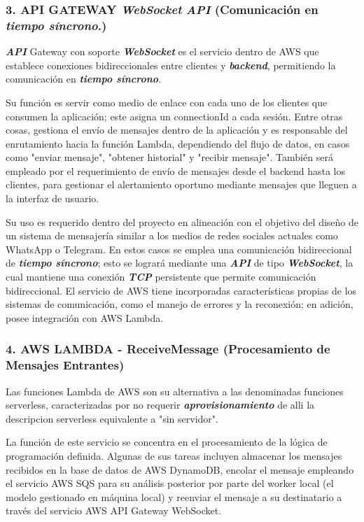 \subsubsection{3. API GATEWAY \textbf{\textit{WebSocket}} \textbf{\textit{API}} (Comunicación en \textbf{\textit{tiempo síncrono}}.)}

\textbf{\textit{API}} Gateway con soporte \textbf{\textit{WebSocket}} es el servicio dentro de AWS que establece conexiones bidireccionales entre clientes y \textbf{\textit{backend}}, permitiendo la comunicación en \textbf{\textit{tiempo síncrono}}.

Su función es servir como medio de enlace con cada uno de los clientes que consumen la aplicación; este asigna un connectionId a cada sesión. Entre otras cosas, gestiona el envío de mensajes dentro de la aplicación y es responsable del enrutamiento hacia la función Lambda, dependiendo del flujo de datos, en casos como "enviar mensaje", "obtener historial" y "recibir mensaje". También será empleado por el requerimiento de envío de mensajes desde el backend hasta los clientes, para gestionar el alertamiento oportuno mediante mensajes que lleguen a la interfaz de usuario.

Su uso es requerido dentro del proyecto en alineación con el objetivo del diseño de un sistema de mensajería similar a los medios de redes sociales actuales como WhatsApp o Telegram. En estos casos se emplea una comunicación bidireccional de \textbf{\textit{tiempo síncrono}}; esto se logrará mediante una \textbf{\textit{API}} de tipo \textbf{\textit{WebSocket}}, la cual mantiene una conexión \textbf{\textit{TCP}} persistente que permite comunicación bidireccional. El servicio de AWS tiene incorporadas características propias de los sistemas de comunicación, como el manejo de errores y la reconexión; en adición, posee integración con AWS Lambda.

\subsubsection{4. AWS LAMBDA - ReceiveMessage (Procesamiento de Mensajes Entrantes)}

Las funciones Lambda de AWS son su alternativa a las denominadas funciones serverless, caracterizadas por no requerir \textbf{\textit{aprovisionamiento}} de alli la descripcion serverless equivalente a "sin servidor".

La función de este servicio se concentra en el procesamiento de la lógica de programación definida. Algunas de sus tareas incluyen almacenar los mensajes recibidos en la base de datos de AWS DynamoDB, encolar el mensaje empleando el servicio AWS SQS para su análisis posterior por parte del worker local (el modelo gestionado en máquina local) y reenviar el mensaje a su destinatario a través del servicio AWS API Gateway WebSocket.

